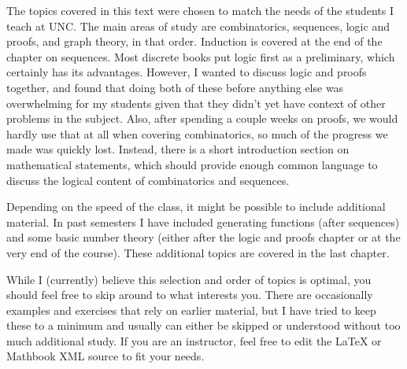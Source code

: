 \documentclass[10pt,]{book}
\theoremstyle{plain}
\theoremstyle{definition}
\theoremstyle{definition}
\theoremstyle{definition}
\numberwithin{equation}{chapter}
\begin{document}
The topics covered in this text were chosen to match the needs of the students I teach at UNC. The main areas of study are combinatorics, sequences, logic and proofs, and graph theory, in that order. Induction is covered at the end of the chapter on sequences. Most discrete books put logic first as a preliminary, which certainly has its advantages. However, I wanted to discuss logic and proofs together, and found that doing both of these before anything else was overwhelming for my students given that they didn't yet have context of other problems in the subject. Also, after spending a couple weeks on proofs, we would hardly use that at all when covering combinatorics, so much of the progress we made was quickly lost.  Instead, there is a short introduction section on mathematical statements, which should provide enough common language to discuss the logical content of combinatorics and sequences.%
\par
\hypertarget{p-4}{}%
Depending on the speed of the class, it might be possible to include additional material. In past semesters I have included generating functions (after sequences) and some basic number theory (either after the logic and proofs chapter or at the very end of the course). These additional topics are covered in the last chapter.%
\par
\hypertarget{p-5}{}%
While I (currently) believe this selection and order of topics is optimal, you should feel free to skip around to what interests you. There are occasionally examples and exercises that rely on earlier material, but I have tried to keep these to a minimum and usually can either be skipped or understood without too much additional study. If you are an instructor, feel free to edit the \LaTeX{} or Mathbook XML source to fit your needs.%
\typeout{************************************************}
\typeout{************************************************}
\end{document}
